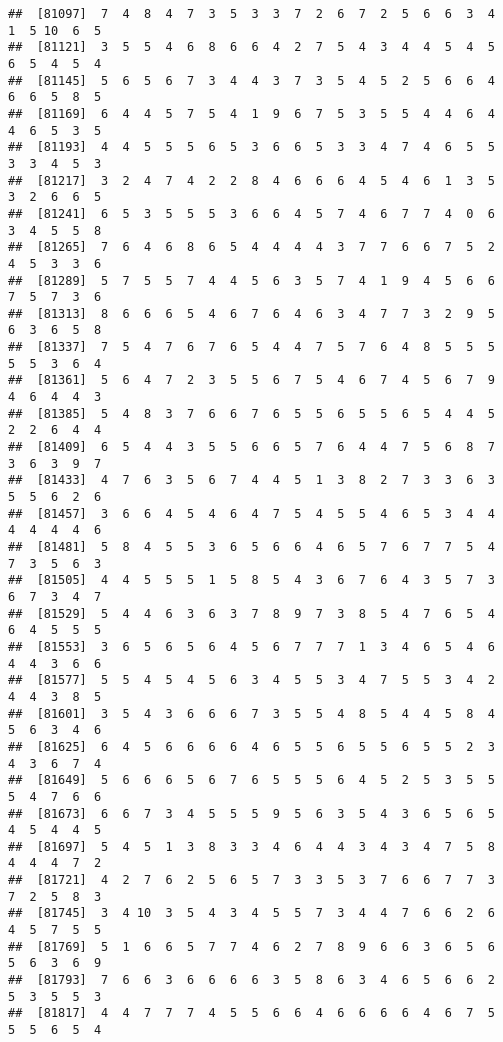 \documentclass[
]{book}
\begin{document}
\begin{verbatim}
##  [81097]  7  4  8  4  7  3  5  3  3  7  2  6  7  2  5  6  6  3  4  1  5 10  6  5
##  [81121]  3  5  5  4  6  8  6  6  4  2  7  5  4  3  4  4  5  4  5  6  5  4  5  4
##  [81145]  5  6  5  6  7  3  4  4  3  7  3  5  4  5  2  5  6  6  4  6  6  5  8  5
##  [81169]  6  4  4  5  7  5  4  1  9  6  7  5  3  5  5  4  4  6  4  4  6  5  3  5
##  [81193]  4  4  5  5  5  6  5  3  6  6  5  3  3  4  7  4  6  5  5  3  3  4  5  3
##  [81217]  3  2  4  7  4  2  2  8  4  6  6  6  4  5  4  6  1  3  5  3  2  6  6  5
##  [81241]  6  5  3  5  5  5  3  6  6  4  5  7  4  6  7  7  4  0  6  3  4  5  5  8
##  [81265]  7  6  4  6  8  6  5  4  4  4  4  3  7  7  6  6  7  5  2  4  5  3  3  6
##  [81289]  5  7  5  5  7  4  4  5  6  3  5  7  4  1  9  4  5  6  6  7  5  7  3  6
##  [81313]  8  6  6  6  5  4  6  7  6  4  6  3  4  7  7  3  2  9  5  6  3  6  5  8
##  [81337]  7  5  4  7  6  7  6  5  4  4  7  5  7  6  4  8  5  5  5  5  5  3  6  4
##  [81361]  5  6  4  7  2  3  5  5  6  7  5  4  6  7  4  5  6  7  9  4  6  4  4  3
##  [81385]  5  4  8  3  7  6  6  7  6  5  5  6  5  5  6  5  4  4  5  2  2  6  4  4
##  [81409]  6  5  4  4  3  5  5  6  6  5  7  6  4  4  7  5  6  8  7  3  6  3  9  7
##  [81433]  4  7  6  3  5  6  7  4  4  5  1  3  8  2  7  3  3  6  3  5  5  6  2  6
##  [81457]  3  6  6  4  5  4  6  4  7  5  4  5  5  4  6  5  3  4  4  4  4  4  4  6
##  [81481]  5  8  4  5  5  3  6  5  6  6  4  6  5  7  6  7  7  5  4  7  3  5  6  3
##  [81505]  4  4  5  5  5  1  5  8  5  4  3  6  7  6  4  3  5  7  3  6  7  3  4  7
##  [81529]  5  4  4  6  3  6  3  7  8  9  7  3  8  5  4  7  6  5  4  6  4  5  5  5
##  [81553]  3  6  5  6  5  6  4  5  6  7  7  7  1  3  4  6  5  4  6  4  4  3  6  6
##  [81577]  5  5  4  5  4  5  6  3  4  5  5  3  4  7  5  5  3  4  2  4  4  3  8  5
##  [81601]  3  5  4  3  6  6  6  7  3  5  5  4  8  5  4  4  5  8  4  5  6  3  4  6
##  [81625]  6  4  5  6  6  6  6  4  6  5  5  6  5  5  6  5  5  2  3  4  3  6  7  4
##  [81649]  5  6  6  6  5  6  7  6  5  5  5  6  4  5  2  5  3  5  5  5  4  7  6  6
##  [81673]  6  6  7  3  4  5  5  5  9  5  6  3  5  4  3  6  5  6  5  4  5  4  4  5
##  [81697]  5  4  5  1  3  8  3  3  4  6  4  4  3  4  3  4  7  5  8  4  4  4  7  2
##  [81721]  4  2  7  6  2  5  6  5  7  3  3  5  3  7  6  6  7  7  3  7  2  5  8  3
##  [81745]  3  4 10  3  5  4  3  4  5  5  7  3  4  4  7  6  6  2  6  4  5  7  5  5
##  [81769]  5  1  6  6  5  7  7  4  6  2  7  8  9  6  6  3  6  5  6  5  6  3  6  9
##  [81793]  7  6  6  3  6  6  6  6  3  5  8  6  3  4  6  5  6  6  2  5  3  5  5  3
##  [81817]  4  4  7  7  7  4  5  5  6  6  4  6  6  6  6  4  6  7  5  5  5  6  5  4

\end{verbatim}
\end{document}

